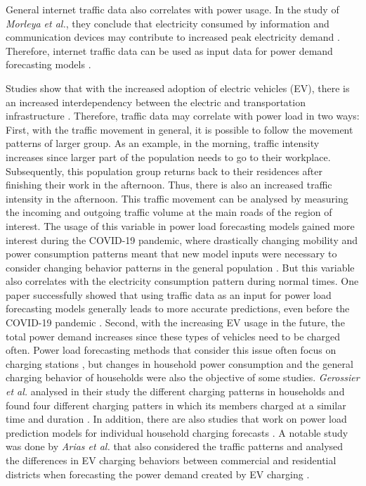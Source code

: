 General internet traffic data also correlates with power usage.
In the study of \textit{Morleya et al.}, they conclude that 
electricity consumed by information and communication devices
may contribute to increased peak electricity demand 
\cite{internettrafficenergycorrelation}.
Therefore, internet traffic data can be used as input data for 
power demand forecasting models \cite{electricityinternetforecast}. 

Studies show that with the increased adoption of electric vehicles (EV), 
there is an increased interdependency between the electric and 
transportation infrastructure \cite{interdependnytrafficenergy}. 
Therefore, traffic data may correlate with power load 
in two ways:
First, with the traffic movement in general, it is possible to follow the
movement patterns of larger group. As an example, in the morning,
traffic intensity increases since larger part of the population needs
to go to their workplace. Subsequently, this population group
returns back to their residences after finishing their work in the afternoon.
Thus, there is also an increased traffic intensity in the afternoon.
This traffic movement can be analysed by measuring the 
incoming and outgoing traffic volume at the main roads of the 
region of interest. The usage of this variable in power load
forecasting models gained more interest during the COVID-19 pandemic, 
where drastically changing mobility and power consumption 
patterns meant that new model inputs were necessary to consider changing
behavior patterns in the general population 
\cite{covidtrafficpower} \cite{covidtrafficpower2}.
But this variable also correlates with the electricity consumption pattern
during normal times. One paper successfully showed that
using traffic data as an input for power load
forecasting models generally leads to more accurate predictions, even before
the COVID-19 pandemic \cite{causalmodeltrafficelectricity}.
Second, with the increasing EV usage in the future, 
the total power demand increases since these types of vehicles 
need to be charged often. Power load forecasting methods that consider this
issue often focus on charging stations \cite{evcharchingstations}
\cite{evcharchingstations2}, but changes in household power consumption 
and the general charging behavior of households
were also the objective of some studies. \textit{Gerossier et al.}
analysed in their study the different charging patterns in households
and found four different charging patters in which its members charged at 
a similar time and duration \cite{gerossier2019modeling}.
In addition, there are also studies that work on
power load prediction models for individual household
charging forecasts \cite{skala2023interval}. 
A notable study was done by \textit{Arias et al.} that also considered the traffic patterns
and analysed the differences in EV charging behaviors between
commercial and residential districts when forecasting the power demand
created by EV charging \cite{arias2016electric}.

